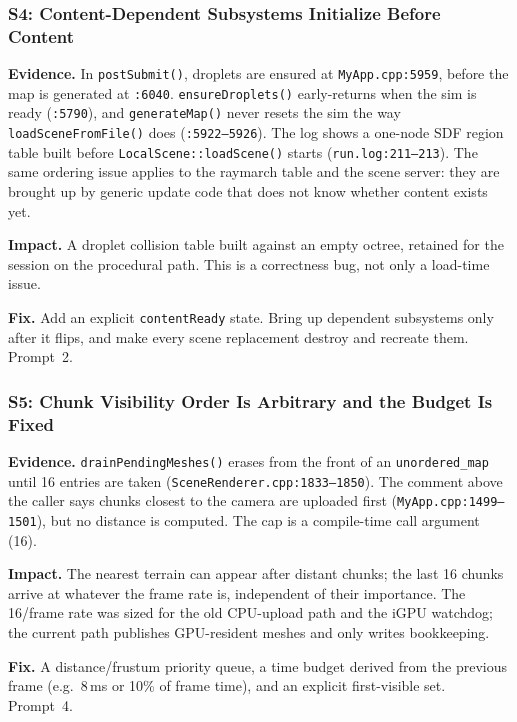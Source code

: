 \documentclass[11pt,a4paper]{article}
\begin{document}
\subsubsection*{S4: Content-Dependent Subsystems Initialize Before Content}

\textbf{Evidence.} In \texttt{postSubmit()}, droplets are ensured at
\texttt{MyApp.cpp:5959}, before the map is generated at \texttt{:6040}.
\texttt{ensureDroplets()} early-returns when the sim is ready
(\texttt{:5790}), and \texttt{generateMap()} never resets the sim the way
\texttt{loadSceneFromFile()} does (\texttt{:5922--5926}). The log shows a
one-node SDF region table built before \texttt{LocalScene::loadScene()}
starts (\texttt{run.log:211--213}). The same ordering issue applies to the
raymarch table and the scene server: they are brought up by generic update
code that does not know whether content exists yet.

\textbf{Impact.} A droplet collision table built against an empty octree,
retained for the session on the procedural path. This is a correctness bug,
not only a load-time issue.

\textbf{Fix.} Add an explicit \texttt{contentReady} state. Bring up dependent
subsystems only after it flips, and make every scene replacement destroy and
recreate them. Prompt~2.

\subsubsection*{S5: Chunk Visibility Order Is Arbitrary and the Budget Is
Fixed}

\textbf{Evidence.} \texttt{drainPendingMeshes()} erases from the front of an
\texttt{unordered\_map} until 16 entries are taken
(\texttt{SceneRenderer.cpp:1833--1850}). The comment above the caller says
chunks closest to the camera are uploaded first
(\texttt{MyApp.cpp:1499--1501}), but no distance is computed. The cap is a
compile-time call argument (16).

\textbf{Impact.} The nearest terrain can appear after distant chunks; the
last 16 chunks arrive at whatever the frame rate is, independent of their
importance. The 16/frame rate was sized for the old CPU-upload path and the
iGPU watchdog; the current path publishes GPU-resident meshes and only writes
bookkeeping.

\textbf{Fix.} A distance/frustum priority queue, a time budget derived from
the previous frame (e.g.\ 8\,ms or 10\% of frame time), and an explicit
first-visible set. Prompt~4.
\end{document}
